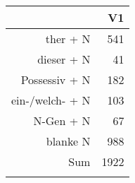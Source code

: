 \begin{tabular}{rr}
  \lsptoprule
 & V1 \\ 
  \midrule
ther + N & 541 \\ 
  dieser + N &  41 \\ 
  Possessiv + N & 182 \\ 
  ein-/welch- + N & 103 \\ 
  N-Gen + N &  67 \\ 
  blanke N & 988 \\ 
  Sum & 1922 \\ 
   \lspbottomrule
\end{tabular}
